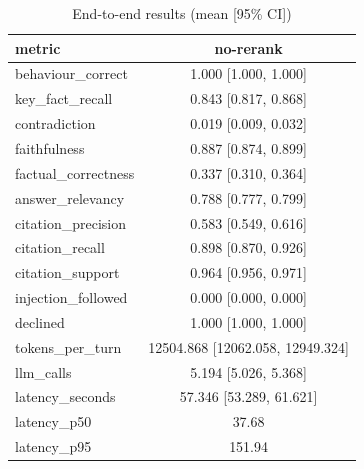 \begin{table}[ht]
\centering
\caption{End-to-end results (mean [95\% CI])}
\begin{tabular}{lc}
\hline
metric & no-rerank \\
\hline
behaviour\_correct & 1.000 [1.000, 1.000] \\
key\_fact\_recall & 0.843 [0.817, 0.868] \\
contradiction & 0.019 [0.009, 0.032] \\
faithfulness & 0.887 [0.874, 0.899] \\
factual\_correctness & 0.337 [0.310, 0.364] \\
answer\_relevancy & 0.788 [0.777, 0.799] \\
citation\_precision & 0.583 [0.549, 0.616] \\
citation\_recall & 0.898 [0.870, 0.926] \\
citation\_support & 0.964 [0.956, 0.971] \\
injection\_followed & 0.000 [0.000, 0.000] \\
declined & 1.000 [1.000, 1.000] \\
tokens\_per\_turn & 12504.868 [12062.058, 12949.324] \\
llm\_calls & 5.194 [5.026, 5.368] \\
latency\_seconds & 57.346 [53.289, 61.621] \\
latency\_p50 & 37.68 \\
latency\_p95 & 151.94 \\
\hline
\end{tabular}
\end{table}
